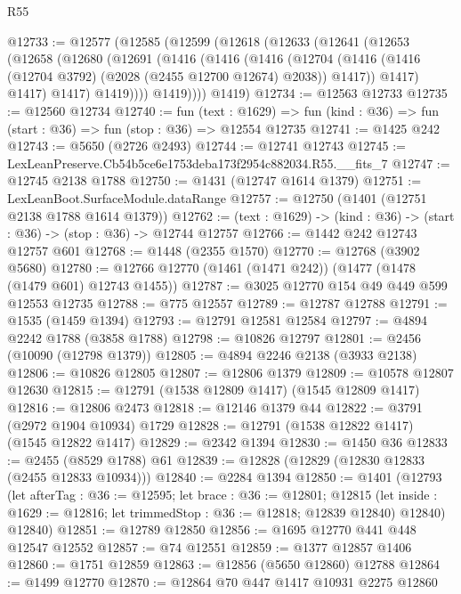 \begin{lexlean}{R55}
\begin{coremodule}
{{@12733 := @12577
    (@12585
      (@12599
        (@12618
          (@12633
            (@12641
              (@12653
                (@12658
                  (@12680
                    (@12691
                      (@1416
                        (@1416
                          (@1416
                            (@12704
                              (@1416
                                (@1416 (@12704 @3792) (@2028 (@2455 @12700 @12674) @2038))
                                @1417))
                            @1417)
                          @1417)
                        @1417)
                      @1419))))
              @1419))))
      @1419)
@12734 := @12563 @12733
@12735 := @12560 @12734
@12740 := fun (text : @1629) =>
  fun (kind : @36) => fun (start : @36) => fun (stop : @36) => @12554 @12735
@12741 := @1425 @242
@12743 := @5650 (@2726 @2493)
@12744 := @12741 @12743
@12745 := LexLeanPreserve.Cb54b5ce6e1753deba173f2954c882034.R55.__fits_7
@12747 := @12745 @2138 @1788
@12750 := @1431 (@12747 @1614 @1379)
@12751 := LexLeanBoot.SurfaceModule.dataRange
@12757 := @12750 (@1401 (@12751 @2138 @1788 @1614 @1379))
@12762 := (text : @1629) -> (kind : @36) -> (start : @36) -> (stop : @36) -> @12744 @12757
@12766 := @1442 @242 @12743 @12757 @601
@12768 := @1448 (@2355 @1570)
@12770 := @12768 (@3902 @5680)
@12780 := @12766 @12770 (@1461 (@1471 @242)) (@1477 (@1478 (@1479 @601) @12743 @1455))
@12787 := @3025 @12770 @154 @49 @449 @599 @12553 @12735
@12788 := @775 @12557
@12789 := @12787 @12788
@12791 := @1535 (@1459 @1394)
@12793 := @12791 @12581 @12584
@12797 := @4894 @2242 @1788 (@3858 @1788)
@12798 := @10826 @12797
@12801 := @2456 (@10090 (@12798 @1379))
@12805 := @4894 @2246 @2138 (@3933 @2138)
@12806 := @10826 @12805
@12807 := @12806 @1379
@12809 := @10578 @12807 @12630
@12815 := @12791 (@1538 @12809 @1417) (@1545 @12809 @1417)
@12816 := @12806 @2473
@12818 := @12146 @1379 @44
@12822 := @3791 (@2972 @1904 @10934) @1729
@12828 := @12791 (@1538 @12822 @1417) (@1545 @12822 @1417)
@12829 := @2342 @1394
@12830 := @1450 @36
@12833 := @2455 (@8529 @1788) @61
@12839 := @12828 (@12829 (@12830 @12833 (@2455 @12833 @10934)))
@12840 := @2284 @1394
@12850 := @1401
    (@12793
      (let afterTag : @36 := @12595;
      let brace : @36 := @12801;
      @12815 (let inside : @1629 := @12816; let trimmedStop : @36 := @12818; @12839 @12840) @12840)
      @12840)
@12851 := @12789 @12850
@12856 := @1695 @12770 @441 @448 @12547 @12552
@12857 := @74 @12551
@12859 := @1377 @12857 @1406
@12860 := @1751 @12859
@12863 := @12856 (@5650 @12860) @12788
@12864 := @1499 @12770
@12870 := @12864 @70 @447 @1417 @10931 @2275 @12860
}}
\end{coremodule}
\end{lexlean}
